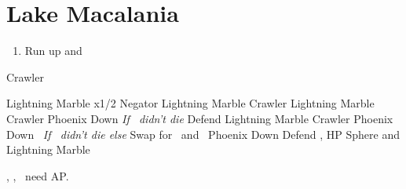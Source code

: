 \chapter{Lake Macalania}

\begin{enumerate}
  \item Run up and \sd
\end{enumerate}
\begin{battle}[1600]{Crawler}
  \begin{itemize}
    \switch{\tidus}{\rikku}
    \rikkuf Lightning Marble x1/2 Negator
    \rikkuf Lightning Marble Crawler
    \kimahrif Lightning Marble Crawler
    \luluf Phoenix Down \rikku
    \switch{\kimahri}{\yuna} \textit{If \kimahri\ didn't die}
    \yunaf Defend
    \rikkuf Lightning Marble Crawler
    \luluf Phoenix Down \rikku\ \textit{If \kimahri\ didn't die else} Swap for \yuna\ and \yuna\ Phoenix Down \rikku
    \switch{\yuna}{\tidus}
    \tidusf Defend
    \rikkuf \od, HP Sphere and Lightning Marble
  \end{itemize}
\tidus, \yuna, \lulu\ need AP.
\end{battle}
